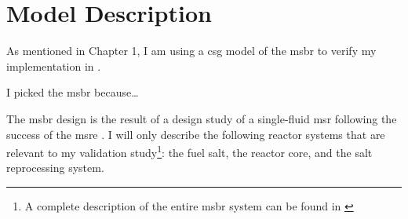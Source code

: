\chapter{Model Description}
\label{ch:chapter4}
As mentioned in Chapter 1, I am using a \Gls{csg} model of the \Gls{msbr}
\cite{robertson_conceptual_1971} to verify my \OpenMC implementation in
\SaltProc.

I picked the \Gls{msbr} because\ldots 

The \Gls{msbr} design is the result of a design study of a single-fluid
\Gls{msr} following the success of the \Gls{msre}
\cite{haubenreich_experience_1970}\cite{rosenthal_molten-salt_1970}.
I will only describe the following reactor systems that are relevant to
my validation study\footnote{A complete description of the entire \Gls{msbr}
system can be found in \cite{robertson_conceptual_1971}}: the fuel salt, the
reactor core, and the salt reprocessing system.

